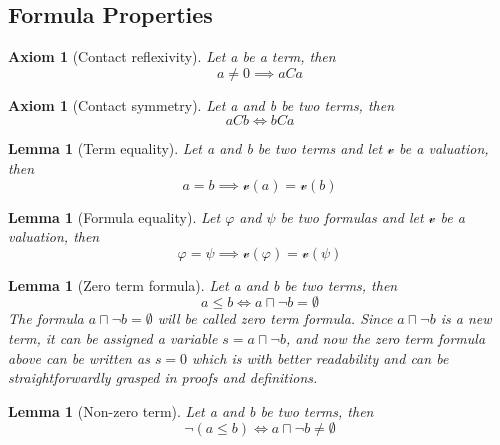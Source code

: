 \documentclass{article}
\newtheorem{lemma}[theorem]{Lemma}
\newtheorem{axiom}[theorem]{Axiom}
\begin{document}
	\subsection{Formula Properties}
\begin{axiom}[Contact reflexivity]
	Let a be a term, then
	\begin{equation*}
		a \neq 0 \implies aCa
	\end{equation*}
\end{axiom}

\begin{axiom}[Contact symmetry]
	Let a and b be two terms, then
	\begin{equation*}
		aCb \iff bCa
	\end{equation*}
\end{axiom}

\begin{lemma}[Term equality]
	Let a and b be two terms and let $\mathscr{v}$ be a valuation, then
	\begin{equation*}
		a = b \implies \mathscr{v}(a) = \mathscr{v}(b)
	\end{equation*}
\end{lemma}

\begin{lemma}[Formula equality]
	Let $\varphi$ and $\psi$ be two formulas and let $\mathscr{v}$ be a valuation, then
	\begin{equation*}
		\varphi = \psi \implies \mathscr{v}(\varphi) = \mathscr{v}(\psi)
	\end{equation*}
\end{lemma}

\begin{lemma}[Zero term formula]
	Let a and b be two terms, then
	\begin{equation*}
		a \le b \iff a \sqcap \neg b = \emptyset
	\end{equation*}
	The formula $a \sqcap \neg b = \emptyset$ will be called zero term formula.
	Since $a \sqcap \neg b$ is a new term, it can be assigned a variable $s = a \sqcap \neg b$, 
	and now the zero term formula above can be written as $s  = 0$ which is with better readability and 
	can be straightforwardly grasped in proofs and definitions.
\end{lemma}

\begin{lemma}[Non-zero term]
	Let a and b be two terms, then
	\begin{equation*}
		\neg(a \le b) \iff a \sqcap \neg b \neq \emptyset
	\end{equation*}
\end{lemma}
\end{document}
